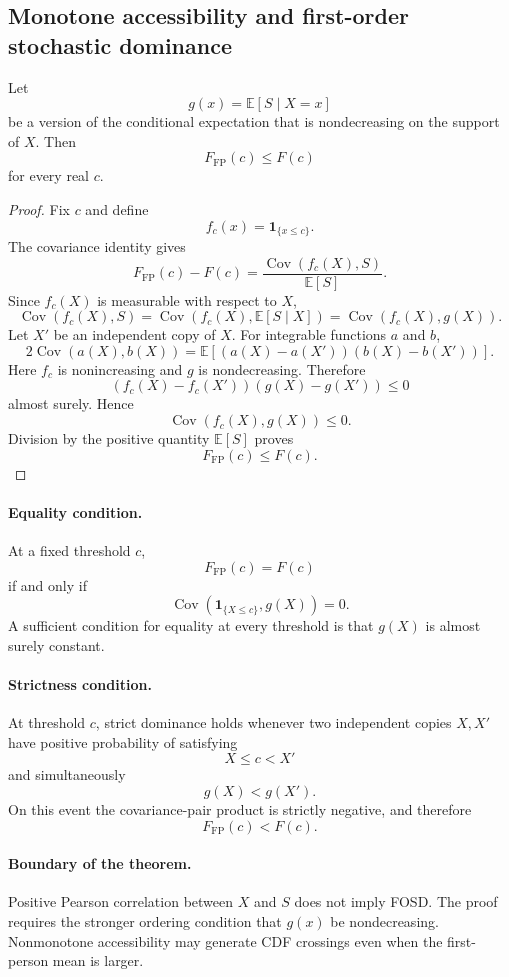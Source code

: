 \subsection{Monotone accessibility and first-order stochastic dominance}

\begin{theorem}
Let
\[
g(x)=\mathbb E[S\mid X=x]
\]
be a version of the conditional expectation that is nondecreasing on the support of $X$. Then
\[
F_{\mathrm{FP}}(c)\le F(c)
\]
for every real $c$.
\end{theorem}

\begin{proof}
Fix $c$ and define
\[
f_c(x)=\mathbf 1_{\{x\le c\}}.
\]
The covariance identity gives
\[
F_{\mathrm{FP}}(c)-F(c)
=
\frac{\operatorname{Cov}(f_c(X),S)}{\mathbb E[S]}.
\]
Since $f_c(X)$ is measurable with respect to $X$,
\[
\operatorname{Cov}(f_c(X),S)
=
\operatorname{Cov}(f_c(X),\mathbb E[S\mid X])
=
\operatorname{Cov}(f_c(X),g(X)).
\]
Let $X'$ be an independent copy of $X$. For integrable functions $a$ and $b$,
\[
2\operatorname{Cov}(a(X),b(X))
=
\mathbb E[(a(X)-a(X'))(b(X)-b(X'))].
\]
Here $f_c$ is nonincreasing and $g$ is nondecreasing. Therefore
\[
(f_c(X)-f_c(X'))(g(X)-g(X'))\le 0
\]
almost surely. Hence
\[
\operatorname{Cov}(f_c(X),g(X))\le 0.
\]
Division by the positive quantity $\mathbb E[S]$ proves
\[
F_{\mathrm{FP}}(c)\le F(c).
\]
\end{proof}

\paragraph{Equality condition.}
At a fixed threshold $c$,
\[
F_{\mathrm{FP}}(c)=F(c)
\]
if and only if
\[
\operatorname{Cov}(\mathbf 1_{\{X\le c\}},g(X))=0.
\]
A sufficient condition for equality at every threshold is that $g(X)$ is almost surely constant.

\paragraph{Strictness condition.}
At threshold $c$, strict dominance holds whenever two independent copies $X,X'$ have positive probability of satisfying
\[
X\le c<X'
\]
and simultaneously
\[
g(X)<g(X').
\]
On this event the covariance-pair product is strictly negative, and therefore
\[
F_{\mathrm{FP}}(c)<F(c).
\]

\paragraph{Boundary of the theorem.}
Positive Pearson correlation between $X$ and $S$ does not imply FOSD. The proof requires the stronger ordering condition that $g(x)$ be nondecreasing. Nonmonotone accessibility may generate CDF crossings even when the first-person mean is larger.

